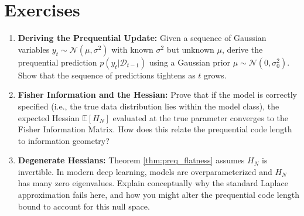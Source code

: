 \section{Exercises}
\begin{enumerate}
    \item \textbf{Deriving the Prequential Update:} Given a sequence of Gaussian variables $y_t \sim \mathcal{N}(\mu, \sigma^2)$ with known $\sigma^2$ but unknown $\mu$, derive the prequential prediction $p(y_t | \mathcal{D}_{t-1})$ using a Gaussian prior $\mu \sim \mathcal{N}(0, \sigma_0^2)$. Show that the sequence of predictions tightens as $t$ grows.
    \item \textbf{Fisher Information and the Hessian:} Prove that if the model is correctly specified (i.e., the true data distribution lies within the model class), the expected Hessian $\mathbb{E}[H_N]$ evaluated at the true parameter converges to the Fisher Information Matrix. How does this relate the prequential code length to information geometry?
    \item \textbf{Degenerate Hessians:} Theorem \ref{thm:preq_flatness} assumes $H_N$ is invertible. In modern deep learning, models are overparameterized and $H_N$ has many zero eigenvalues. Explain conceptually why the standard Laplace approximation fails here, and how you might alter the prequential code length bound to account for this null space.
\end{enumerate}

